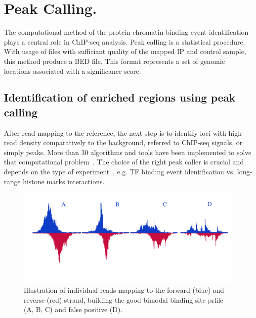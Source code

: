 \chapter{Peak Calling.}

The computational method of the protein-chromatin binding event identification plays a central role in ChIP-seq analysis. 
Peak calling is a statistical procedure.
With usage of files with sufficiant quality of the mapped IP and control sample, this method produce a BED file.
This format represents a set of genomic locations associated with a significance score.

\section{Identification of enriched regions using peak calling}



 
After read mapping to the reference, the next step is to identify loci with high read density comparatively to the background, referred to ChIP-seq signals, or simply peaks.
More than 30 algorithms and tools have been implemented to solve that computational problem~\cite{chen2012systematic}.
The choice of the right peak caller is crucial and depends on the type of experiment~\cite{nakato2017recent}, e.g. TF binding event identification vs. long-range histone marks interactions.

\begin{figure}[b!]
    \centering
    \includegraphics[width=\textwidth]{../img/peaks_final.pdf}
    \caption{Illustration of individual reads mapping to the forward (blue) and reverse (red) strand, building the good bimodal binding site prfile (A, B, C) and false positive (D). }
    \label{fig:graph_classes}
\end{figure}


